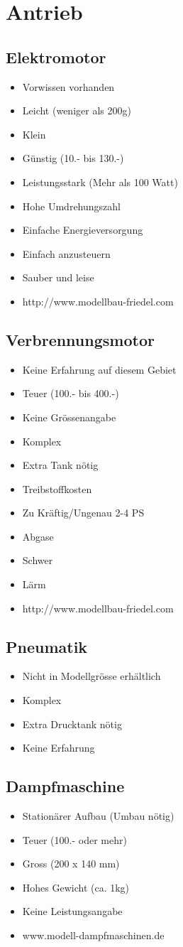 \section{Antrieb}

\subsection{Elektromotor}
\begin{itemize}
\item Vorwissen vorhanden
\item Leicht (weniger als 200g)
\item Klein
\item Günstig (10.- bis 130.-)
\item Leistungsstark (Mehr als 100 Watt)
\item Hohe Umdrehungszahl
\item Einfache Energieversorgung
\item Einfach anzusteuern
\item Sauber und leise
\item http://www.modellbau-friedel.com
\end{itemize}

\subsection{Verbrennungsmotor}
\begin{itemize}
\item Keine Erfahrung auf diesem Gebiet
\item Teuer (100.- bis 400.-)
\item Keine Grössenangabe
\item Komplex
\item Extra Tank nötig
\item Treibstoffkosten
\item Zu Kräftig/Ungenau 2-4 PS
\item Abgase
\item Schwer
\item Lärm
\item http://www.modellbau-friedel.com
\end{itemize}

\subsection{Pneumatik}
\begin{itemize}
\item Nicht in Modellgrösse erhältlich
\item Komplex
\item Extra Drucktank nötig
\item Keine Erfahrung
\end{itemize}

\subsection{Dampfmaschine}
\begin{itemize}
\item Stationärer Aufbau (Umbau nötig)
\item Teuer (100.- oder mehr)
\item Gross (200 x 140 mm)
\item Hohes Gewicht (ca. 1kg)
\item Keine Leistungsangabe
\item www.modell-dampfmaschinen.de
\end{itemize}
